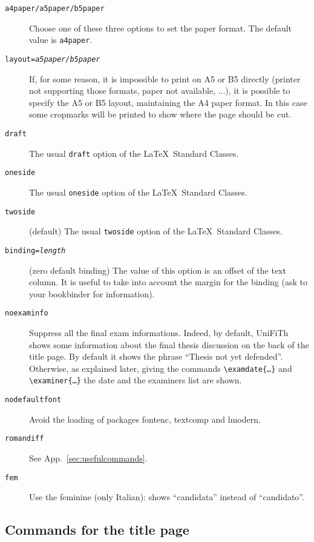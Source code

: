 \documentclass[a5paper,11pt]{article}
\newcommand{\bs}{\textbackslash}
\begin{document}
\begin{description}

\item[\texttt{a4paper/a5paper/b5paper}] Choose one of these three options to set the paper format. The default value is \texttt{a4paper}.
\item[\texttt{layout=\textsl{a5paper/b5paper}}] If, for some reason, it is impossible to print on A5 or B5 directly (printer not supporting those formats, paper not available, ...), it is possible to specify the A5 or B5 layout, maintaining the A4 paper format. In this case some cropmarks will be printed to show where the page should be cut.
\item[\texttt{draft}] The usual \texttt{draft} option of the \LaTeX\ Standard Classes.
\item[\texttt{oneside}] The usual \texttt{oneside} option of the \LaTeX\ Standard Classes.
\item[\texttt{twoside}] (default) The usual \texttt{twoside} option of the \LaTeX\ Standard Classes.

\item[\texttt{binding=\textsl{length}}] (zero default binding)
The value of this option is an offset of the text column.
It is useful to take into account the margin for the binding (ask to your bookbinder for information).
\item[\texttt{noexaminfo}] Suppress all the final exam informations. Indeed, by default, \textsf{UniFiTh} shows some information about the final thesis discussion on the back of the title page. By default it shows the phrase ``Thesis not yet defended''. Otherwise, as explained later, giving the commands 
\texttt{\bs examdate\{\dots\}} and \texttt{\bs examiner\{\dots\}} the date and
the examiners list are shown.
\item[\texttt{nodefaultfont}] Avoid the loading of packages \textsf{fontenc}, \textsf{textcomp} and \textsf{lmodern}.
\item[\texttt{romandiff}] See App.~\ref{sec:usefulcommands}.
\item[\texttt{fem}] Use the feminine (only Italian): shows ``candidata'' instead of ``candidato''.
\end{description}

\subsection[Commands for the\\ title page]{Commands for the title page}
\label{commands_titlepage}
\end{document}

